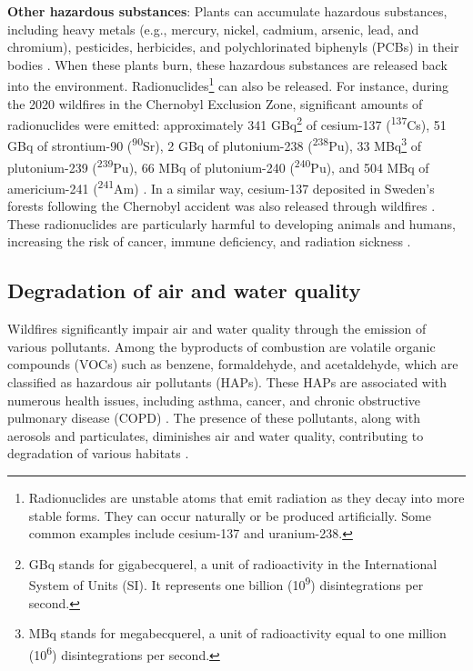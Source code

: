 \documentclass[
  12 pt,
]{Nemilov}
\begin{document}
\begin{enumerate}
  \textbf{Other hazardous substances}: Plants can accumulate hazardous substances, including heavy metals (e.g., mercury, nickel, cadmium, arsenic, lead, and chromium), pesticides, herbicides, and polychlorinated biphenyls (PCBs) in their bodies \citep{ali2013phytoremediation, jabeen2009phytoremediation, muthusaravanan2018phytoremediation}. When these plants burn, these hazardous substances are released back into the environment. Radionuclides\footnote{Radionuclides are unstable atoms that emit radiation as they decay into more stable forms. They can occur naturally or be produced artificially. Some common examples include cesium-137 and uranium-238.} can also be released. For instance, during the 2020 wildfires in the Chernobyl Exclusion Zone, significant amounts of radionuclides were emitted: approximately 341 GBq\footnote{GBq stands for gigabecquerel, a unit of radioactivity in the International System of Units (SI). It represents one billion (10\textsuperscript{9}) disintegrations per second.} of cesium-137 (\textsuperscript{137}Cs), 51 GBq of strontium-90 (\textsuperscript{90}Sr), 2 GBq of plutonium-238 (\textsuperscript{238}Pu), 33 MBq\footnote{MBq stands for megabecquerel, a unit of radioactivity equal to one million (10\textsuperscript{6}) disintegrations per second.} of plutonium-239 (\textsuperscript{239}Pu), 66 MBq of plutonium-240 (\textsuperscript{240}Pu), and 504 MBq of americium-241 (\textsuperscript{241}Am) \citep{evangeliou2020uncovering, igarashi2020impact, masson2021europe}. In a similar way, cesium-137 deposited in Sweden's forests following the Chernobyl accident was also released through wildfires \citep{martinsson2021experimental}. These radionuclides are particularly harmful to developing animals and humans, increasing the risk of cancer, immune deficiency, and radiation sickness \citep{kamiya2015long, lindell1987radiation}.
\end{enumerate}

\subsection{Degradation of air and water quality}\label{degradation-of-air-and-water-quality}

Wildfires significantly impair air and water quality through the emission of various pollutants. Among the byproducts of combustion are volatile organic compounds (VOCs) such as benzene, formaldehyde, and acetaldehyde, which are classified as hazardous air pollutants (HAPs). These HAPs are associated with numerous health issues, including asthma, cancer, and chronic obstructive pulmonary disease (COPD) \citep{choi2018harmful, leikauf2002hazardous, loh2007ranking}. The presence of these pollutants, along with aerosols and particulates, diminishes air and water quality, contributing to degradation of various habitats \citep{mehaffey2009evaluating, zvereva2010responses}.
\end{document}
